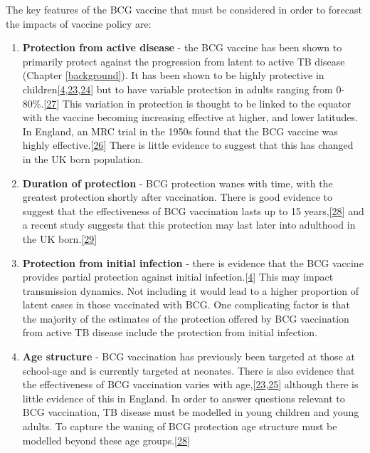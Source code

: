 \documentclass[11pt,twoside]{bristolthesis}
\begin{document}
  The key features of the BCG vaccine that must be considered in order to forecast the impacts of vaccine policy are:
  \begin{enumerate}
  \def\labelenumi{\arabic{enumi}.}
  \item
    \textbf{Protection from active disease} - the BCG vaccine has been shown to primarily protect against the progression from latent to active TB disease (Chapter \ref{background}). It has been shown to be highly protective in children{[}\protect\hyperlink{ref-Roy2014}{4},\protect\hyperlink{ref-Rodrigues1993}{23},\protect\hyperlink{ref-Colditz1994}{24}{]} but to have variable protection in adults ranging from 0-80\%.{[}\protect\hyperlink{ref-Zwerling2011}{27}{]} This variation in protection is thought to be linked to the equator with the vaccine becoming increasing effective at higher, and lower latitudes. In England, an MRC trial in the 1950s found that the BCG vaccine was highly effective.{[}\protect\hyperlink{ref-Hart1972}{26}{]} There is little evidence to suggest that this has changed in the UK born population.
  \item
    \textbf{Duration of protection} - BCG protection wanes with time, with the greatest protection shortly after vaccination. There is good evidence to suggest that the effectiveness of BCG vaccination lasts up to 15 years,{[}\protect\hyperlink{ref-Abubakar2013}{28}{]} and a recent study suggests that this protection may last later into adulthood in the UK born.{[}\protect\hyperlink{ref-Mangtani2017}{29}{]}
  \item
    \textbf{Protection from initial infection} - there is evidence that the BCG vaccine provides partial protection against initial infection.{[}\protect\hyperlink{ref-Roy2014}{4}{]} This may impact transmission dynamics. Not including it would lead to a higher proportion of latent cases in those vaccinated with BCG. One complicating factor is that the majority of the estimates of the protection offered by BCG vaccination from active TB disease include the protection from initial infection.
  \item
    \textbf{Age structure} - BCG vaccination has previously been targeted at those at school-age and is currently targeted at neonates. There is also evidence that the effectiveness of BCG vaccination varies with age,{[}\protect\hyperlink{ref-Rodrigues1993}{23},\protect\hyperlink{ref-Mangtani2014a}{25}{]} although there is little evidence of this in England. In order to answer questions relevant to BCG vaccination, TB disease must be modelled in young children and young adults. To capture the waning of BCG protection age structure must be modelled beyond these age groups.{[}\protect\hyperlink{ref-Abubakar2013}{28}{]}

\end{enumerate}
\end{document}
